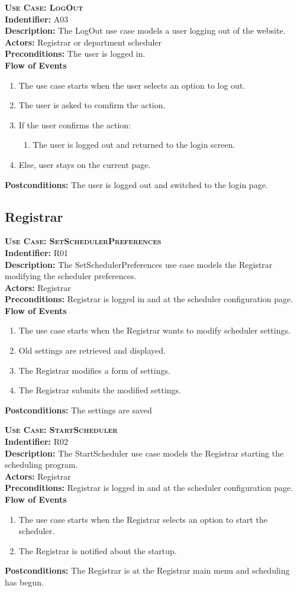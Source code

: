 \documentclass[11pt]{article}
\newcounter{id}
\newenvironment{usecase}{%
	\def\title##1{ {\large \bfseries  \scshape {Use Case:} ##1} \\ }
 	\def\id##1{{\bf Indentifier:} ##1\\}
	\def\des##1{ {\bf Description:} ##1\\}
	\def\actors##1{ {\bf Actors:} ##1\\}
    	\def\pre##1{ {\bf Preconditions:} ##1 \\} %
    	\def\flow##1{ {\bf Flow of Events} ##1}%
    	\newenvironment{ucenum}{%
        	\begin{enumerate}[nolistsep]\small}%
        	{\end{enumerate}}
	\def\post##1{ {\bf Postconditions:} ##1 \\}
}{\vspace{.05in}}
\begin{document}
\begin{usecase}
  \title{LogOut}
  \id{A03}
  \des{The LogOut use case models a user logging out of the website.}
  \actors{Registrar or department scheduler}
  \pre{The user is logged in.}
  \flow{}
  \begin{ucenum}
  \item The use case starts when the user selects an option to log out.
  \item The user is asked to comfirm the action.
  \item If the user confirms the action:
    \begin{ucenum}
    \item The user is logged out and returned to the login screen.
    \end{ucenum}
  \item Else, user stays on the current page.
  \end{ucenum}
  \post{The user is logged out and switched to the login page.}
\end{usecase}

\subsection{Registrar}
\begin{usecase}
  \title{SetSchedulerPreferences}
  \id{R01}
  \des{The SetSchedulerPreferences use case models the Registrar modifying the scheduler preferences.}
  \actors{Registrar}
  \pre{Registrar is logged in and at the scheduler configuration page.}
  \flow{}
  \begin{ucenum}
  \item The use case starts when the Registrar wants to modify scheduler settings.
  \item Old settings are retrieved and displayed.
  \item The Registrar modifies a form of settings.
  \item The Registrar submits the modified settings.
  \end{ucenum}
  \post{The settings are saved}
\end{usecase}

\begin{usecase}
  \title{StartScheduler}
  \id{R02}
  \des{The StartScheduler use case models the Registrar starting the scheduling program.}
  \actors{Registrar}
  \pre{Registrar is logged in and at the scheduler configuration page.}
  \flow{}
  \begin{ucenum}
  \item The use case starts when the Registrar selects an option to start the scheduler.
  \item The Registrar is notified about the startup.
  \end{ucenum}
  \post{The Registrar is at the Registrar main menu and scheduling has begun.}
\end{usecase}
\end{document}
